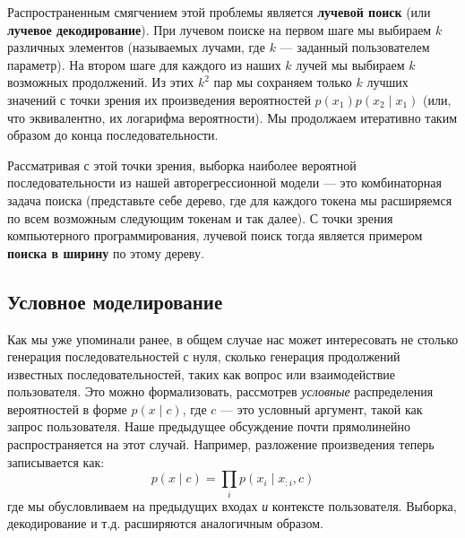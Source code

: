 Распространенным смягчением этой проблемы является \textbf{лучевой поиск} (или \textbf{лучевое декодирование}). При лучевом поиске на первом шаге мы выбираем $k$ различных элементов (называемых лучами, где $k$ — заданный пользователем параметр). На втором шаге для каждого из наших $k$ лучей мы выбираем $k$ возможных продолжений. Из этих $k^2$ пар мы сохраняем только $k$ лучших значений с точки зрения их произведения вероятностей $p(x_1)p(x_2\mid x_1)$ (или, что эквивалентно, их логарифма вероятности). Мы продолжаем итеративно таким образом до конца последовательности.

Рассматривая с этой точки зрения, выборка наиболее вероятной последовательности из нашей авторегрессионной модели — это комбинаторная задача поиска (представьте себе дерево, где для каждого токена мы расширяемся по всем возможным следующим токенам и так далее). С точки зрения компьютерного программирования, лучевой поиск тогда является примером \textbf{поиска в ширину} по этому дереву.

\subsection{Условное моделирование}
\label{subsec:conditional_modelling}

Как мы уже упоминали ранее, в общем случае нас может интересовать не столько генерация последовательностей с нуля, сколько генерация продолжений известных последовательностей, таких как вопрос или взаимодействие пользователя. Это можно формализовать, рассмотрев \textit{условные} распределения вероятностей в форме $p(x \mid c)$, где $c$ — это условный аргумент, такой как запрос пользователя. Наше предыдущее обсуждение почти прямолинейно распространяется на этот случай. Например, разложение произведения теперь записывается как:
%
$$
p(x \mid c)=\prod_ip(x_i \mid x_{:i},c)
$$
%
где мы обусловливаем на предыдущих входах \textit{и} контексте пользователя. Выборка, декодирование и т.д. расширяются аналогичным образом. 

